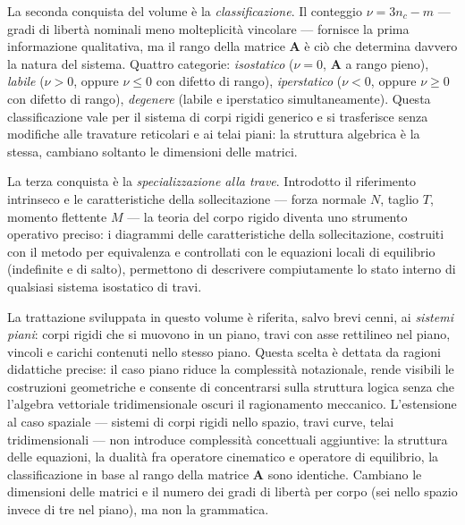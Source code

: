 La seconda conquista del volume è la \textit{classificazione}. Il conteggio $\nu = 3n_c - m$ --- gradi di libertà nominali meno molteplicità vincolare --- fornisce la prima informazione qualitativa, ma il rango della matrice $\bm{A}$ è ciò che determina davvero la natura del sistema. Quattro categorie: \textit{isostatico} ($\nu = 0$, $\bm{A}$ a rango pieno), \textit{labile} ($\nu > 0$, oppure $\nu \leq 0$ con difetto di rango), \textit{iperstatico} ($\nu < 0$, oppure $\nu \geq 0$ con difetto di rango), \textit{degenere} (labile e iperstatico simultaneamente). Questa classificazione vale per il sistema di corpi rigidi generico e si trasferisce senza modifiche alle travature reticolari e ai telai piani: la struttura algebrica è la stessa, cambiano soltanto le dimensioni delle matrici.

La terza conquista è la \textit{specializzazione alla trave}. Introdotto il riferimento intrinseco e le caratteristiche della sollecitazione --- forza normale $N$, taglio $T$, momento flettente $M$ --- la teoria del corpo rigido diventa uno strumento operativo preciso: i diagrammi delle caratteristiche della sollecitazione, costruiti con il metodo per equivalenza e controllati con le equazioni locali di equilibrio (indefinite e di salto), permettono di descrivere compiutamente lo stato interno di qualsiasi sistema isostatico di travi.

\begin{oss}
	La trattazione sviluppata in questo volume è riferita, salvo brevi cenni, ai \textit{sistemi piani}: corpi rigidi che si muovono in un piano, travi con asse rettilineo nel piano, vincoli e carichi contenuti nello stesso piano. Questa scelta è dettata da ragioni didattiche precise: il caso piano riduce la complessità notazionale, rende visibili le costruzioni geometriche e consente di concentrarsi sulla struttura logica senza che l'algebra vettoriale tridimensionale oscuri il ragionamento meccanico. L'estensione al caso spaziale --- sistemi di corpi rigidi nello spazio, travi curve, telai tridimensionali --- non introduce complessità concettuali aggiuntive: la struttura delle equazioni, la dualità fra operatore cinematico e operatore di equilibrio, la classificazione in base al rango della matrice $\bm{A}$ sono identiche. Cambiano le dimensioni delle matrici e il numero dei gradi di libertà per corpo (sei nello spazio invece di tre nel piano), ma non la grammatica.
\end{oss}

